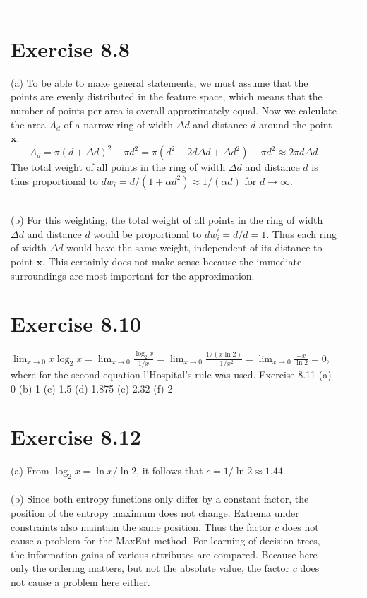 \documentclass[10pt]{book}
\begin{document}
\begin{center}
\begin{tabular}{|l|l|l|}
\section{Exercise 8.8}
(a) To be able to make general statements, we must assume that the points are evenly distributed in the feature space, which means that the number of points per area is overall approximately equal. Now we calculate the area $A_{d}$ of a narrow ring of width $\Delta d$ and distance $d$ around the point $\boldsymbol{x}$:
$$
A_{d}=\pi(d+\Delta d)^{2}-\pi d^{2}=\pi\left(d^{2}+2 d \Delta d+\Delta d^{2}\right)-\pi d^{2} \approx 2 \pi d \Delta d
$$
The total weight of all points in the ring of width $\Delta d$ and distance $d$ is thus proportional to $d w_{i}=d /\left(1+\alpha d^{2}\right) \approx 1 /(\alpha d)$ for $d \rightarrow \infty$.\\
(b) For this weighting, the total weight of all points in the ring of width $\Delta d$ and distance $d$ would be proportional to $d w_{i}^{\prime}=d / d=1$. Thus each ring of width $\Delta d$ would have the same weight, independent of its distance to point $\boldsymbol{x}$. This certainly does not make sense because the immediate surroundings are most important for the approximation.

\section{Exercise 8.10}
$\lim _{x \rightarrow 0} x \log _{2} x=\lim _{x \rightarrow 0} \frac{\log _{2} x}{1 / x}=\lim _{x \rightarrow 0} \frac{1 /(x \ln 2)}{-1 / x^{2}}=\lim _{x \rightarrow 0} \frac{-x}{\ln 2}=0$, where for the second equation l'Hospital's rule was used.
Exercise 8.11 (a) 0 (b) 1 (c) 1.5 (d) 1.875 (e) $2.32$ (f) 2

\section{Exercise 8.12}
(a) From $\log_{2} x=\ln x / \ln 2$, it follows that $c=1 / \ln 2 \approx 1.44$.\\
(b) Since both entropy functions only differ by a constant factor, the position of the entropy maximum does not change. Extrema under constraints also maintain the same position. Thus the factor $c$ does not cause a problem for the MaxEnt method. For learning of decision trees, the information gains of various attributes are compared. Because here only the ordering matters, but not the absolute value, the factor $c$ does not cause a problem here either.


\end{tabular}
\end{center}
\end{document}
